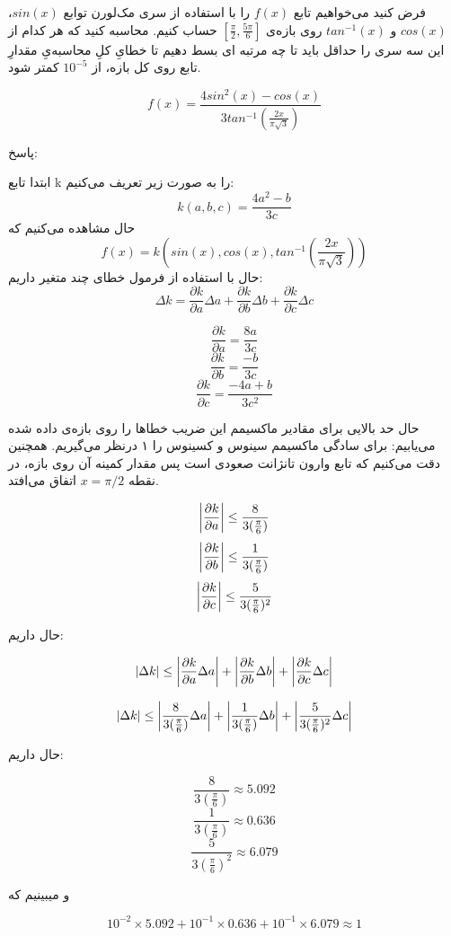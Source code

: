 فرض کنید می‌خواهیم تابع 
$f(x)$
را با استفاده از سری مک‌لورن توابع $sin(x)$، $cos(x)$ و $tan^{-1}(x)$ روی بازه‌ی $[\frac{\pi}{2}, \frac{5\pi}{6}]$ حساب کنیم.
محاسبه کنید که هر کدام از این سه سری را حداقل باید تا چه مرتبه ای بسط دهیم تا خطایِ کلِ محاسبه‌یِ مقدارِ تابع روی کل بازه، از $10^{-5}$ کمتر شود.

$$f(x) = \frac{ 4sin^2(x) - cos(x) }{3tan^{-1}(\frac{2x}{\pi \sqrt{3}})}$$

\begin{comment}
\end{comment}
پاسخ:

ابتدا تابع k را به صورت زیر تعریف می‌کنیم:
$$k(a,b,c) = \frac{4a^2 - b}{3c}$$
حال مشاهده می‌کنیم که 
$$f(x) = k(sin(x), cos(x), tan^{-1}(\frac{2x}{\pi \sqrt{3}}))$$
حال با استفاده از فرمول خطای چند متغیر داریم:
$$\Delta k = \frac{\partial k}{\partial a} \Delta a + \frac{\partial k}{\partial b} \Delta b + \frac{\partial k}{\partial c} \Delta c$$

$$\frac{\partial k}{\partial a} = \frac{8a}{3c}$$
$$\frac{\partial k}{\partial b} = \frac{-b}{3c}$$
$$\frac{\partial k}{\partial c} = \frac{-4a + b}{3c^2}$$

حال حد بالایی برای مقادیر ماکسیمم این ضریب خطاها را روی بازه‌ی داده شده می‌یابیم:
برای سادگی ماکسیمم سینوس و کسینوس را ۱ درنظر می‌گیریم. همچنین دقت می‌کنیم که تابع وارون تانژانت صعودی است پس مقدار کمینه آن روی بازه، در نقطه $x=\pi/2$ اتفاق می‌افتد.

$$\abs{\frac{\partial k}{\partial a}} \leq \frac{8}{3 (\frac{\pi}{6})}$$
$$\abs{\frac{\partial k}{\partial b}} \leq \frac{1}{3 (\frac{\pi}{6})}$$
$$\abs{\frac{\partial k}{\partial c}} \leq \frac{5}{3 (\frac{\pi}{6})^2}$$

حال داریم:

$$|\Delta k| \leq \abs{\frac{\partial k}{\partial a} \Delta a} + \abs{\frac{\partial k}{\partial b} \Delta b} + \abs{\frac{\partial k}{\partial c} \Delta c}$$

$$|\Delta k| \leq \abs{ \frac{8}{3 (\frac{\pi}{6})} \Delta a} + \abs{\frac{1}{3 (\frac{\pi}{6})} \Delta b} + \abs{\frac{5}{3 (\frac{\pi}{6})^2} \Delta c}$$

حال داریم:

$$\frac{8}{3 (\frac{\pi}{6})} \approx 5.092$$
$$\frac{1}{3 (\frac{\pi}{6})} \approx 0.636$$
$$\frac{5}{3 (\frac{\pi}{6})^2} \approx 6.079$$

و میبینیم که 

$$10^{-2} \times 5.092 + 10^{-1} \times 0.636 + 10^{-1} \times 6.079 \approx 1$$

